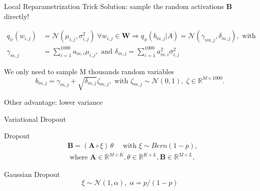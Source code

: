 \documentclass{beamer}
\newcommand{\bW}{\mathbf{W}}
\newcommand{\bA}{\mathbf{A}}
\newcommand{\bB}{\mathbf{B}}
\begin{document}
\begin{frame}{Local Reparametrization Trick}
	Solution: sample the random activations $\bB$ directly!
	
	\begin{equation*}
		\begin{split}
			q_\psi(w_{i, j}) &= \mathcal{N}(\mu_{i, j}, \sigma_{i, j}^2) \; \forall w_{i, j} \in \bW \Longrightarrow q_\phi(b_{m, j} | A) = \mathcal{N}(\gamma_{im, j}, \delta_{m, j}), \text{ with} \\
			\gamma_{m, j} &= \sum\limits_{i=1}^{1000} a_{m, i} \mu_{i, j}, \text{ and } \delta_{m, j} = \sum\limits_{i=1}^{1000} a_{m, i}^2 \sigma_{i, j}^2
		\end{split}
	\end{equation*}

	We only need to sample M thousands random variables
	\begin{equation*}
		b_{m,j} = \gamma_{m,j} + \sqrt{\delta_{m,j}} \zeta_{m, j}, \text{ with } \zeta_{m, j} \sim \mathcal{N}(0, 1), \; \zeta \in \mathbb{R}^{M \times 1000}.
	\end{equation*}

	Other advantage: lower variance
\end{frame}

\begin{frame}{Variational Dropout}
	\begin{block}{Dropout}
	    \begin{equation*}
	    	\begin{split}
	    		&\bB = (\bA \circ \xi) \, \theta \quad \text{ with } \xi \sim Bern(1-p), \\ &\text{ where } \bA \in \mathbb{R}^{M \times K}, \theta \in \mathbb{R}^{K \times L}, \bB \in \mathbb{R}^{M \times L},
	    	\end{split}
	    \end{equation*}
	\end{block}
	
	\begin{block}{Gaussian Dropout}
		\begin{equation*}
			\xi \sim \mathcal{N}(1, \alpha), \; \alpha = p / (1-p)
		\end{equation*}
	\end{block}

\end{frame}
\end{document}
